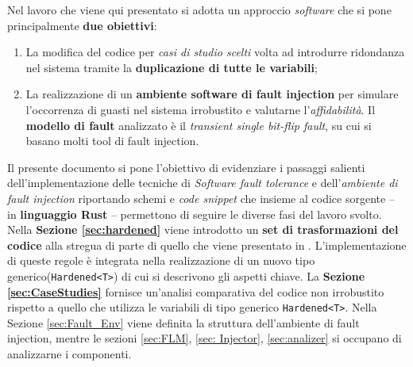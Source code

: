 \noindent
Nel lavoro che viene qui presentato si adotta un approccio \textit{software} che si pone principalmente \textbf{due obiettivi}: 
\begin{enumerate}
    \itemsep-0.3em
    \item La modifica del codice per \textit{casi di studio scelti} volta ad introdurre ridondanza nel sistema tramite la \textbf{duplicazione di tutte le variabili}; 
    \item La realizzazione di un \textbf{ambiente software di fault injection} per simulare l'occorrenza di guasti nel sistema irrobustito e valutarne l'\textit{affidabilità}. Il \textbf{modello di fault} analizzato è il \textit{transient single bit-flip fault}, su cui si basano molti tool di fault injection.
\end{enumerate}

\noindent 
Il presente documento si pone l'obiettivo di evidenziare i passaggi salienti dell'implementazione delle tecniche di \textit{Software fault tolerance} e dell'\textit{ambiente di fault injection} riportando schemi e \textit{code snippet}  che insieme al codice sorgente -- in \textbf{linguaggio Rust} -- permettono di seguire le diverse fasi del lavoro svolto.\\
Nella \textbf{Sezione \ref{sec:hardened}} viene introdotto un \textbf{set di trasformazioni del codice} alla stregua di parte di quello che viene presentato in \cite{rebaudengo1999soft}. L'implementazione di queste regole è integrata nella realizzazione di un nuovo tipo generico(\texttt{Hardened<T>}) di cui si descrivono gli aspetti chiave. La \textbf{Sezione \ref{sec:CaseStudies}} fornisce un'analisi comparativa del codice non irrobustito rispetto a quello che utilizza le variabili di tipo generico \texttt{Hardened<T>}. Nella Sezione \ref{sec:Fault_Env} viene definita la struttura dell'ambiente di fault injection, mentre le sezioni \ref{sec:FLM}, \ref{sec: Injector}, \ref{sec:analizer} si occupano di analizzarne i componenti.
